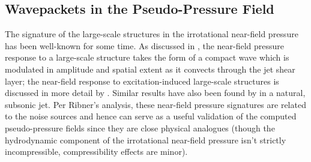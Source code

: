\subsection{Wavepackets in the Pseudo-Pressure Field}
The signature of the large-scale structures in the irrotational near-field pressure has been well-known for some time.
As discussed in , the near-field pressure response to a large-scale structure takes the form of a compact wave which is modulated in amplitude and spatial extent as it convects through the jet shear layer; the near-field response to excitation-induced large-scale structures is discussed in more detail by \citet{Sinha2012}.
Similar results have also been found by \citet{Tinney2008} in a natural, subsonic jet.
Per Ribner's analysis, these near-field pressure signatures are related to the noise sources and hence can serve as a useful validation of the computed pseudo-pressure fields since they are close physical analogues (though the hydrodynamic component of the irrotational near-field pressure isn't strictly incompressible, compressibility effects are minor). 
